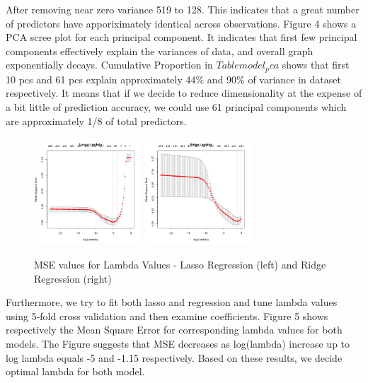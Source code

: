 \documentclass[letterpaper, 10 pt, conference]{ieeeconf}\usepackage[]{graphicx}\usepackage[]{color}
\begin{document}
After removing near zero variance 519 to 128. This indicates that a great number of predictors have apporiximately identical across observations. Figure 4 shows a PCA scree plot for each principal component. It indicates that first few principal components effectively explain the variances of data, and overall graph exponentially decays. Cumulative Proportion in $Table model_pca$ shows that first 10 pcs and 61 pcs explain approximately 44\% and 90\% of variance in dataset respectively. It means that if we decide to reduce dimensionality at the expense of a bit little of prediction accuracy, we could use 61 principal components which are approximately 1/8 of total predictors. 

   \begin{figure}[thpb]
      \centering
      \includegraphics[width =  4cm, height = 4cm]{../images/model_lasso_lambda.png}
      \includegraphics[width =  4cm, height = 4cm]{../images/model_ridge_lambda.png}
      \caption{MSE values for Lambda Values - Lasso Regression (left) and Ridge Regression (right)}
      \label{figurelabel}
   \end{figure}

Furthermore, we try to fit both lasso and regression and tune lambda values using 5-fold cross validation and then examine coefficients. Figure 5 shows respectively the Mean Square Error for corresponding lambda values for both models. The Figure suggests that MSE decreases as log(lambda) increase up to log lambda equals -5 and  -1.15 respectively. Based on these results, we decide optimal lambda for both model. 
\end{document}
